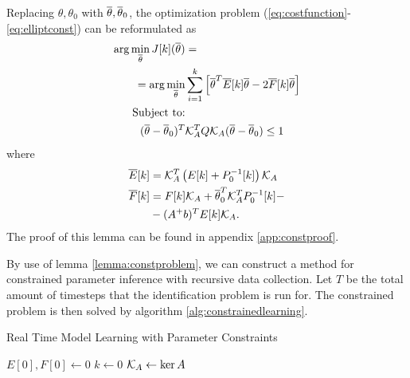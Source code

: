 \begin{lemma}
Replacing $\theta, \theta_0$ with $\overline{\theta}, \overline{\theta}_0$, the optimization problem
(\ref{eq:costfunction}-\ref{eq:elliptconst}) can be reformulated as
\begin{align}
    \arg\min\limits_{\overline{\theta}} J[k](\overline{\theta}) &= \notag
        \\ = \arg\min\limits_{\overline{\theta}} &
            \sum\limits_{i=1}^k \left[\overline{\theta}^T\overline{E}[k]\overline{\theta} - 2\overline{F}[k]\overline{\theta}\right]
            \label{eq:Jconst}\\
    \text{Subject to:}& \notag \\
    (\overline{\theta}-\overline{\theta}_0)^T&\mathcal{K}_A^TQ\mathcal{K}_A(\overline{\theta}-\overline{\theta}_0) \leq 1
    \label{eq:redelliptconst}
\end{align}
where
\begin{align}
        \overline{E}[k] &= \mathcal{K}_A^T\left(E[k] + P_0^{-1}[k]\right)\mathcal{K}_A \label{eq:Econst}\\
        \overline{F}[k] &= F[k]\mathcal{K}_A + \overline{\theta}_0^T\mathcal{K}_A^TP_0^{-1}[k] - \notag \\
        &-(A^+b)^TE[k]\mathcal{K}_A \label{eq:Fconst}.
\end{align}
The proof of this lemma can be found in appendix \ref{app:constproof}.
\label{lemma:constproblem}
\end{lemma}

By use of lemma \ref{lemma:constproblem}, we can construct a method for constrained
parameter inference with recursive data collection. Let $T$ be the total amount of timesteps
that the identification problem is run for. The constrained problem is then solved by
algorithm \ref{alg:constrainedlearning}.
\begin{algorithm}
    \caption{Real Time Model Learning with Parameter Constraints}
    \label{alg:constrainedlearning}
    $E[0], F[0] \gets 0$\;
    $k \gets 0$\;
    $\mathcal{K}_A \gets \ker A$\;
\end{algorithm}